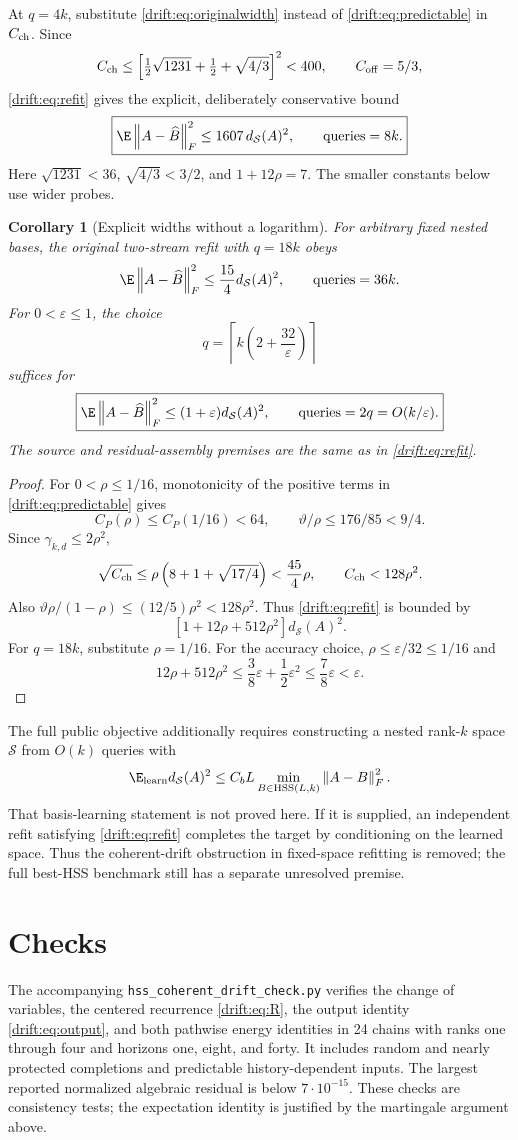 \documentclass[11pt,oneside,openany,a4paper]{book}
\numberwithin{equation}{chapter}
\newtheorem{corollary}[theorem]{Corollary}
\theoremstyle{definition}
\theoremstyle{remark}
\newcommand{\F}[1]{\left\lVert#1\right\rVert_F}
\begin{document}
At $q=4k$, substitute \eqref{drift:eq:originalwidth} instead of
\eqref{drift:eq:predictable} in $C_{\rm ch}$. Since
\[
 C_{\rm ch}\le
 \left[\tfrac12\sqrt{1231}+\tfrac12+\sqrt{4/3}\right]^2<400,
 \qquad C_{\rm off}=5/3,
\]
\eqref{drift:eq:refit} gives the explicit, deliberately conservative bound
\[
 \boxed{\E\F{A-\widehat B}^2\le1607\,d_{\mathcal S}(A)^2,
 \qquad\text{queries}=8k.}
\]
Here $\sqrt{1231}<36$, $\sqrt{4/3}<3/2$, and
$1+12\rho=7$. The smaller constants below use wider probes.

\begin{corollary}[Explicit widths without a logarithm]
For arbitrary fixed nested bases, the original two-stream refit with
$q=18k$ obeys
\[
 \E\F{A-\widehat B}^2\le\frac{15}{4}d_{\mathcal S}(A)^2,
 \qquad \text{queries}=36k.
\]
For $0<\varepsilon\le1$, the choice
\[
 \boxed{q=\left\lceil k\left(2+\frac{32}{\varepsilon}\right)\right\rceil}
\]
suffices for
\[
 \boxed{\E\F{A-\widehat B}^2\le(1+\varepsilon)d_{\mathcal S}(A)^2,
 \qquad \text{queries}=2q=O(k/\varepsilon).}
\]
The source and residual-assembly premises are the same as in
\eqref{drift:eq:refit}.
\end{corollary}
\begin{proof}
For $0<\rho\le1/16$, monotonicity of the positive terms in
\eqref{drift:eq:predictable} gives
\[
 C_P(\rho)\le C_P(1/16)<64,\qquad
 \vartheta/\rho\le176/85<9/4.
\]
Since $\gamma_{k,d}\le2\rho^2$,
\[
 \sqrt{C_{\rm ch}}\le\rho\left(8+1+\sqrt{17/4}\right)
 <\frac{45}{4}\rho,
 \qquad C_{\rm ch}<128\rho^2.
\]
Also $\vartheta\rho/(1-\rho)\le(12/5)\rho^2<128\rho^2$.
Thus \eqref{drift:eq:refit} is bounded by
\[
 [1+12\rho+512\rho^2]d_{\mathcal S}(A)^2.
\]
For $q=18k$, substitute $\rho=1/16$. For the accuracy choice,
$\rho\le\varepsilon/32\le1/16$ and
\[
 12\rho+512\rho^2\le\frac38\varepsilon+\frac12\varepsilon^2
 \le\frac78\varepsilon<\varepsilon.
\]
\end{proof}

The full public objective additionally requires constructing a nested
rank-$k$ space $\mathcal S$ from $O(k)$ queries with
\[
 \E_{\rm learn}d_{\mathcal S}(A)^2
 \le C_b L\min_{B\in\mathrm{HSS}(L,k)}\F{A-B}^2.
\]
That basis-learning statement is not proved here. If it is supplied,
an independent refit satisfying \eqref{drift:eq:refit} completes the target by
conditioning on the learned space. Thus the coherent-drift obstruction
in fixed-space refitting is removed; the full best-HSS benchmark still
has a separate unresolved premise.

\section{Checks}
The accompanying \texttt{hss\_coherent\_drift\_check.py} verifies the
change of variables, the centered recurrence \eqref{drift:eq:R}, the output
identity \eqref{drift:eq:output}, and both pathwise energy identities in 24
chains with ranks one through four and horizons one, eight, and forty.
It includes random and nearly protected completions and predictable
history-dependent inputs. The largest reported normalized algebraic
residual is below $7\cdot10^{-15}$. These checks are consistency tests;
the expectation identity is justified by the martingale argument above.
\end{document}
